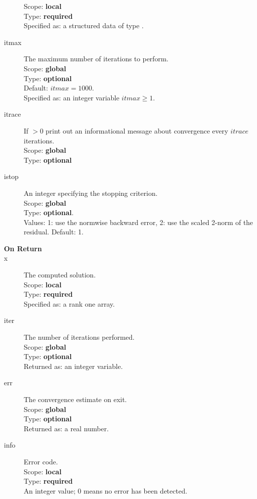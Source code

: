 \begin{description}
Scope: {\bf local} \\
Type: {\bf required}\\
Specified as: a structured data of type \descdata.
\item[itmax]  The maximum number of iterations to perform.\\
Scope: {\bf global} \\
Type: {\bf optional}\\
Default: $itmax = 1000$.\\
Specified as: an integer variable $itmax \ge 1$.
\item[itrace] If $>0$  print out an informational message about
  convergence  every $itrace$ iterations.\\ 
Scope: {\bf global} \\
Type: {\bf optional}\\
\item[istop]  An integer specifying the stopping criterion.\\
Scope: {\bf global} \\
Type: {\bf optional}.\\
Values: 1: use the normwise backward error, 2: use the scaled 2-norm
of the residual. Default: 1. 
\item[\bf On Return] 
\item[x] The computed solution. \\
Scope: {\bf local} \\
Type: {\bf required}\\
Specified as: a rank one array.
\item[iter]  The number of iterations performed.\\
Scope: {\bf global} \\
Type: {\bf optional}\\
Returned  as: an integer variable.
\item[err]  The convergence estimate on exit.\\
Scope: {\bf global} \\
Type: {\bf optional}\\
Returned  as: a real number.
\item[info] Error code.\\
Scope: {\bf local} \\
Type: {\bf required} \\
An integer value; 0 means no error has been detected. 
\end{description}


